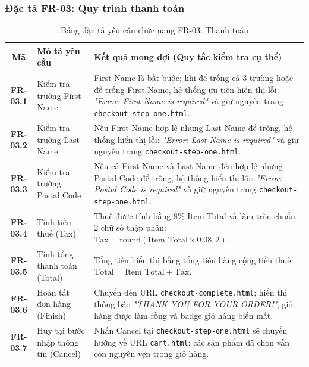 \documentclass[a4paper]{article}
\begin{document}
\subsubsection{Đặc tả FR-03: Quy trình thanh toán}
\begin{table}[H]
\centering
\small
\begin{tabularx}{\textwidth}{|c|p{4.5cm}|X|}
\hline
\textbf{Mã} & \textbf{Mô tả yêu cầu} & \textbf{Kết quả mong đợi (Quy tắc kiểm tra cụ thể)} \\ \hline
\textbf{FR-03.1} & Kiểm tra trường First Name & First Name là bắt buộc; khi để trống cả 3 trường hoặc để trống First Name, hệ thống ưu tiên hiển thị lỗi: \textit{"Error: First Name is required"} và giữ nguyên trang \texttt{checkout-step-one.html}. \\ \hline
\textbf{FR-03.2} & Kiểm tra trường Last Name & Nếu First Name hợp lệ nhưng Last Name để trống, hệ thống hiển thị lỗi: \textit{"Error: Last Name is required"} và giữ nguyên trang \texttt{checkout-step-one.html}. \\ \hline
\textbf{FR-03.3} & Kiểm tra trường Postal Code & Nếu cả First Name và Last Name đều hợp lệ nhưng Postal Code để trống, hệ thống hiển thị lỗi: \textit{"Error: Postal Code is required"} và giữ nguyên trang \texttt{checkout-step-one.html}. \\ \hline
\textbf{FR-03.4} & Tính tiền thuế (Tax) & Thuế được tính bằng 8\% Item Total và làm tròn chuẩn 2 chữ số thập phân: $\text{Tax} = \text{round}(\text{Item Total} \times 0.08, 2)$. \\ \hline
\textbf{FR-03.5} & Tính tổng thanh toán (Total) & Tổng tiền hiển thị bằng tổng tiền hàng cộng tiền thuế: $\text{Total} = \text{Item Total} + \text{Tax}$. \\ \hline
\textbf{FR-03.6} & Hoàn tất đơn hàng (Finish) & Chuyển đến URL \texttt{checkout-complete.html}; hiển thị thông báo \textit{"THANK YOU FOR YOUR ORDER!"}; giỏ hàng được làm rỗng và badge giỏ hàng biến mất. \\ \hline
\textbf{FR-03.7} & Hủy tại bước nhập thông tin (Cancel) & Nhấn Cancel tại \texttt{checkout-step-one.html} sẽ chuyển hướng về URL \texttt{cart.html}; các sản phẩm đã chọn vẫn còn nguyên vẹn trong giỏ hàng. \\ \hline
\end{tabularx}
\caption{Bảng đặc tả yêu cầu chức năng FR-03: Thanh toán}
\end{table}
\end{document}
